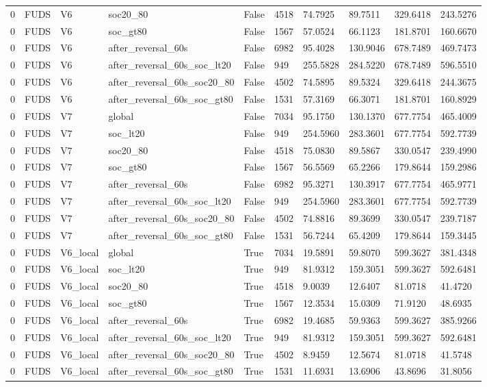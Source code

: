 \begin{tabular}{llllllllll}
0 & FUDS & V6 & soc20\_80 & False & 4518 & 74.7925 & 89.7511 & 329.6418 & 243.5276 \\
0 & FUDS & V6 & soc\_gt80 & False & 1567 & 57.0524 & 66.1123 & 181.8701 & 160.6670 \\
0 & FUDS & V6 & after\_reversal\_60s & False & 6982 & 95.4028 & 130.9046 & 678.7489 & 469.7473 \\
0 & FUDS & V6 & after\_reversal\_60s\_soc\_lt20 & False & 949 & 255.5828 & 284.5220 & 678.7489 & 596.5510 \\
0 & FUDS & V6 & after\_reversal\_60s\_soc20\_80 & False & 4502 & 74.5895 & 89.5324 & 329.6418 & 244.3675 \\
0 & FUDS & V6 & after\_reversal\_60s\_soc\_gt80 & False & 1531 & 57.3169 & 66.3071 & 181.8701 & 160.8929 \\
0 & FUDS & V7 & global & False & 7034 & 95.1750 & 130.1370 & 677.7754 & 465.4009 \\
0 & FUDS & V7 & soc\_lt20 & False & 949 & 254.5960 & 283.3601 & 677.7754 & 592.7739 \\
0 & FUDS & V7 & soc20\_80 & False & 4518 & 75.0830 & 89.5867 & 330.0547 & 239.4990 \\
0 & FUDS & V7 & soc\_gt80 & False & 1567 & 56.5569 & 65.2266 & 179.8644 & 159.2986 \\
0 & FUDS & V7 & after\_reversal\_60s & False & 6982 & 95.3271 & 130.3917 & 677.7754 & 465.9771 \\
0 & FUDS & V7 & after\_reversal\_60s\_soc\_lt20 & False & 949 & 254.5960 & 283.3601 & 677.7754 & 592.7739 \\
0 & FUDS & V7 & after\_reversal\_60s\_soc20\_80 & False & 4502 & 74.8816 & 89.3699 & 330.0547 & 239.7187 \\
0 & FUDS & V7 & after\_reversal\_60s\_soc\_gt80 & False & 1531 & 56.7244 & 65.4209 & 179.8644 & 159.3445 \\
0 & FUDS & V6\_local & global & True & 7034 & 19.5891 & 59.8070 & 599.3627 & 381.4348 \\
0 & FUDS & V6\_local & soc\_lt20 & True & 949 & 81.9312 & 159.3051 & 599.3627 & 592.6481 \\
0 & FUDS & V6\_local & soc20\_80 & True & 4518 & 9.0039 & 12.6407 & 81.0718 & 41.4720 \\
0 & FUDS & V6\_local & soc\_gt80 & True & 1567 & 12.3534 & 15.0309 & 71.9120 & 48.6935 \\
0 & FUDS & V6\_local & after\_reversal\_60s & True & 6982 & 19.4685 & 59.9363 & 599.3627 & 385.9266 \\
0 & FUDS & V6\_local & after\_reversal\_60s\_soc\_lt20 & True & 949 & 81.9312 & 159.3051 & 599.3627 & 592.6481 \\
0 & FUDS & V6\_local & after\_reversal\_60s\_soc20\_80 & True & 4502 & 8.9459 & 12.5674 & 81.0718 & 41.5748 \\
0 & FUDS & V6\_local & after\_reversal\_60s\_soc\_gt80 & True & 1531 & 11.6931 & 13.6906 & 43.8696 & 31.8056 \\
\hline
\end{tabular}
